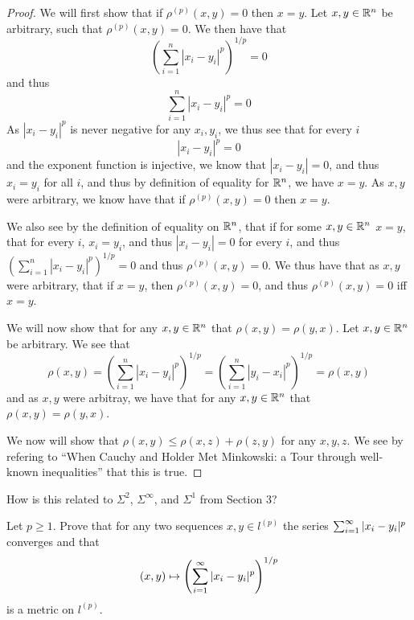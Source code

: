 \begin{proof}
  We will first show that if $\rho^{(p)}(x,y)=0$ then $x=y$. Let $x,y
  \in \mathbb{R}^n$ be arbitrary, such that $\rho^{(p)}(x,y)=0$. We then have that 
  $$(\sum_{i=1}^n |x_i - y_i|^p)^{1/p} =0$$
  and thus
  $$\sum_{i=1}^n |x_i - y_i|^p =0$$
  As $|x_i - y_i|^p$ is never negative for any $x_i,y_i$, we thus see
  that for every $i$
  $$|x_i - y_i|^p =0$$ and the exponent function is injective, we know
  that $|x_i - y_i|=0$, and thus $x_i=y_i$ for all $i$, and thus by
  definition of equality for $\mathbb{R}^n$, we have $x=y$. As $x,y$ were
  arbitrary, we know have that  if $\rho^{(p)}(x,y)=0$ then $x=y$.

  We also see by the definition of equality on $\mathbb{R}^n$, that if for
  some $x,y\in \mathbb{R}^n$ $x=y$, that for
  every $i$, $x_i=y_i$, and thus $|x_i-y_i|=0$ for every $i$, and thus
  $(\sum_{i=1}^n |x_i - y_i|^p)^{1/p}=0$  and thus
  $\rho^{(p)}(x,y)=0$. We thus have that as $x,y$ were arbitrary, that
  if $x=y$, then $\rho^{(p)}(x,y)=0$, and thus $\rho^{(p)}(x,y)=0$ iff
  $x=y$.

  We will now show that for any $x,y\in \mathbb{R}^n$ that
  $\rho(x,y)=\rho(y,x)$. Let $x,y\in \mathbb{R}^n$ be arbitrary.
  We see that 
  $$\rho(x,y) = 
  (\sum_{i=1}^n |x_i - y_i|^p)^{1/p}= 
  (\sum_{i=1}^n |y_i - x_i|^p)^{1/p}= 
  \rho(x,y)$$
  and as $x,y$ were arbitray, we have that 
   for any $x,y\in \mathbb{R}^n$ that
  $\rho(x,y)=\rho(y,x)$.

  We now will show that $\rho(x,y) \leq \rho(x,z) + \rho(z,y)$ for any
  $x,y,z$. We see by refering to ``When Cauchy and Holder Met
  Minkowski: a Tour through well-known inequalities'' that this is true.
\end{proof}

\begin{minorEx}
    [Riddle]
    How is this related to $\Sigma^2$, $\Sigma^{\infty}$, and $\Sigma^1$ from
    Section 3?
\end{minorEx}

\begin{minorEx}
    Let $p \geq 1$. Prove that for any two sequences $x, y \in l^{(p)}$ the
    series $\sum_{i=1}^{\infty} |x_i - y_i|^p$ converges and that
    \[
        (x, y) \mapsto \left( \sum_{i=1}^{\infty} |x_i - y_i|^p
        \right)^{1/p}
    \]
    is a metric on $l^{(p)}$.
\end{minorEx}
